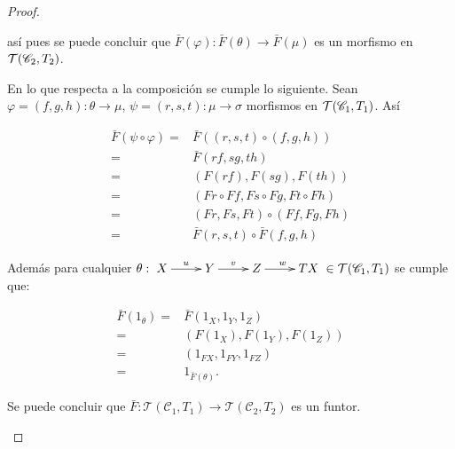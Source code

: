 \documentclass{article}
\begin{document}
\begin{enumerate}[label=\textbf{Ej \arabic*.}]
\begin{proof}
\begin{enumerate}
				as\'i pues se puede concluir que $\bar{F}(\varphi):\bar{F}(\theta)\to \bar{F}(\mu)$ es un morfismo en $\mathcal{T}(\mathscr{C}_{2},T_{2})$.
				
				\bigskip
				
				En lo que respecta a la composici\'on se cumple lo siguiente. Sean $\varphi=(f,g,h):\theta \to \mu$, $\psi=(r,s,t):\mu \to \sigma$ morfismos en $\mathcal{T}(\mathscr{C}_{1},T_{1})$. As\'i
				
				\begin{align*}
					\bar{F}(\psi \circ \varphi) =& \bar{F}((r,s,t)\circ (f,g,h))\\
					=& \bar{F}(rf,sg,th)\\
					=& (F(rf),F(sg),F(th))\\
					=& (Fr\circ Ff,Fs\circ Fg,Ft\circ Fh)\\
					=& (Fr,Fs,Ft)\circ (Ff,Fg,Fh)\\
					=& \bar{F}(r,s,t)\circ \bar{F}(f,g,h)
				\end{align*}
				
				Adem\'as para cualquier $\theta : \xymatrix{X\ar[r]^u & Y\ar[r]^v & Z\ar[r]^w & TX } \in \mathcal{T}(\mathscr{C}_{1},T_{1})$ se cumple que:
				
				\begin{align*}
					\bar{F}(1_{\theta}) =& \bar{F}(1_{X},1_{Y},1_{Z})\\
					=& ( F(1_{X}),F(1_{Y}),F(1_{Z}) )\\
					=& (1_{FX},1_{FY},1_{FZ})\\
					=& 1_{\bar{F}(\theta)}.
				\end{align*}
				
				Se puede concluir que $\bar{F}:\mathcal{T}(\mathscr{C}_{1},T_{1})\to \mathcal{T}(\mathscr{C}_{2},T_{2})$ es un funtor.
				

\end{enumerate}
\end{proof}
\end{enumerate}
\end{document}
